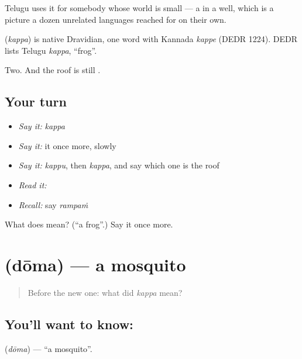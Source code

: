 Telugu uses it for somebody whose world is small — a  in a well, which is a picture a dozen unrelated languages reached for on their own.

\begin{cousinweb}
\textbf{} (\emph{kappa}) is native Dravidian, one word with Kannada \emph{kappe} (DEDR 1224). DEDR lists Telugu \emph{kappa}, \textquotedblleft{}frog\textquotedblright{}.
\end{cousinweb}

\begin{grammarlens}[title={What you've built}]
Two. And the roof is still .
\end{grammarlens}

\subsection*{Your turn}
\begin{itemize}
\raggedright
  \item \emph{Say it:} \emph{kappa}
  \item \emph{Say it:} it once more, slowly
  \item \emph{Say it:} \emph{kappu}, then \emph{kappa}, and say which one is the roof
  \item \emph{Read it:} \textbf{}
  \item \emph{Recall:} say \emph{rampaṁ}
\end{itemize}

\begin{tcolorbox}[breakable,colback=teal!4,colframe=teal!35!black,title={Before you move on}]
What does  mean? (\textquotedblleft{}a frog\textquotedblright{}.) Say it once more.
\end{tcolorbox}
\section[\texorpdfstring{\te{దోమ} (dōma)}{దోమ (dōma)}]{ (dōma) — a mosquito}

\label{lesson:TE-C70-mosquito}



\begin{quote}
Before the new one: what did \emph{kappa} mean?
\end{quote}

\subsection*{You'll want to know: }
\textbf{} (\emph{dōma}) — \textquotedblleft{}a mosquito\textquotedblright{}.

